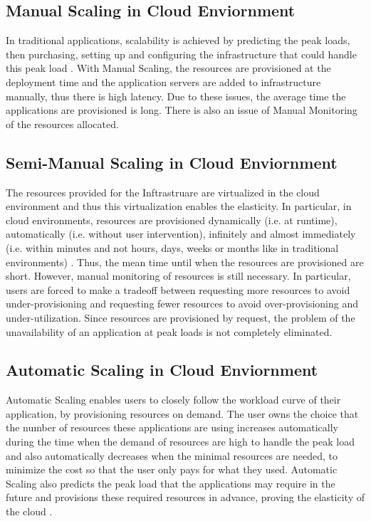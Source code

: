 \documentclass[9pt,twocolumn,twoside]{../../styles/osajnl}
\begin{document}
\subsection{Manual Scaling in Cloud Enviornment}

In traditional applications, scalability is achieved by predicting the
peak loads, then purchasing, setting up and configuring the
infrastructure that could handle this peak load \cite{ManualScaling}. With Manual
Scaling, the resources are provisioned at the deployment time and the
application servers are added to infrastructure manually, thus there is
high latency. Due to these issues, the average time the applications
are provisioned is long. There is also an issue of Manual
Monitoring of the resources allocated.

\subsection{Semi-Manual Scaling in Cloud Enviornment}

The resources provided for the Inftrastruare are virtualized in the cloud
environment and thus this virtualization enables the elasticity. In
particular, in cloud environments, resources are provisioned
dynamically (i.e. at runtime), automatically (i.e. without user
intervention), infinitely and almost immediately (i.e. within minutes
and not hours, days, weeks or months like in traditional
environments) \cite{elastic-beanstalk}. Thus, the mean time until when
the resources are provisioned are short.  However, manual monitoring
of resources is still necessary. In particular, users are forced to
make a tradeoff between requesting more resources to avoid
under-provisioning and requesting fewer resources to avoid
over-provisioning and under-utilization. Since resources are
provisioned by request, the problem of the unavailability of an
application at peak loads is not completely eliminated.

\subsection{Automatic Scaling in Cloud Enviornment}

Automatic Scaling enables users to closely follow the workload curve
of their application, by provisioning resources on demand. The user
owns the choice that the number of resources these applications are
using increases automatically during the time when the demand of
resources are high to handle the peak load and also automatically
decreases when the minimal resources are needed, to minimize the cost
so that the user only pays for what they used. Automatic Scaling also
predicts the peak load that the applications may require in the future
and provisions these required resources in advance, proving the
elasticity of the cloud  \cite{elastic-beanstalk}.
\end{document}
